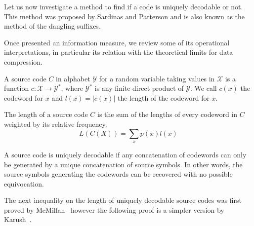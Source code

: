 Let us now investigate a method to find if a code is uniquely decodable or not. This method was proposed by Sardinas and Patterson \cite{} and is also known as the method of the dangling suffixes. 

Once presented an information measure, we review some of its operational interpretations, in particular its relation with the theoretical limits for data compression.

A source code $C$ in alphabet $\mathcal{Y}$ for a random variable taking values in $\mathcal{X}$ is a function $c:\mathcal{X}\longrightarrow \mathcal{Y}^*$, where $\mathcal{Y}^*$ is any finite direct product of $\mathcal{Y}$. We call $c(x)$ the codeword for $x$ and $l(x)=|c(x)|$ the length of the codeword for $x$.

The length of a source code $C$ is the sum of the lengths of every codeword in $C$ weighted by its relative frequency.
\begin{equation}
L(C(X)) = \sum_{x} p(x) l(x)
\end{equation}

A source code is uniquely decodable if any concatenation of codewords can only be generated by a unique concatenation of source symbols. In other words, the source symbols generating the codewords can be recovered with no possible equivocation. 

The next inequality on the length of uniquely decodable source codes was first proved by McMillan~\cite{McMillan_56} however the following proof is a simpler version by Karush~\cite{Karush_61,Cover_91}.

